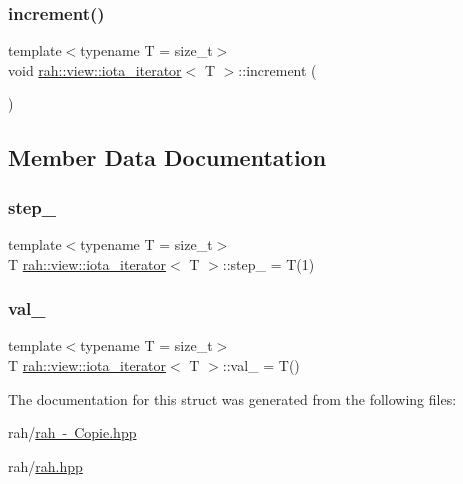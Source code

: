 \mbox{\label{structrah_1_1view_1_1iota__iterator_a52be6587654c9783137bf31d800f315d}} 
\subsubsection{\texorpdfstring{increment()}{increment()}\hspace{0.1cm}{\footnotesize\ttfamily [2/2]}}
{\footnotesize\ttfamily template$<$typename T  = size\+\_\+t$>$ \\
void \mbox{\hyperlink{structrah_1_1view_1_1iota__iterator}{rah\+::view\+::iota\+\_\+iterator}}$<$ T $>$\+::increment (\begin{DoxyParamCaption}{ }\end{DoxyParamCaption})\hspace{0.3cm}{\ttfamily [inline]}}



\subsection{Member Data Documentation}
\mbox{\label{structrah_1_1view_1_1iota__iterator_ac30abc689d8d82810bf78ceec3893bd2}} 
\subsubsection{\texorpdfstring{step\_}{step\_}}
{\footnotesize\ttfamily template$<$typename T  = size\+\_\+t$>$ \\
T \mbox{\hyperlink{structrah_1_1view_1_1iota__iterator}{rah\+::view\+::iota\+\_\+iterator}}$<$ T $>$\+::step\+\_\+ = T(1)}

\mbox{\label{structrah_1_1view_1_1iota__iterator_a7a2ef77dc1a09b2eea42804c2297d057}} 
\subsubsection{\texorpdfstring{val\_}{val\_}}
{\footnotesize\ttfamily template$<$typename T  = size\+\_\+t$>$ \\
T \mbox{\hyperlink{structrah_1_1view_1_1iota__iterator}{rah\+::view\+::iota\+\_\+iterator}}$<$ T $>$\+::val\+\_\+ = T()}



The documentation for this struct was generated from the following files\+:\begin{DoxyCompactItemize}
\item 
rah/\mbox{\hyperlink{rah_01-_01_copie_8hpp}{rah -\/ Copie.\+hpp}}\item 
rah/\mbox{\hyperlink{rah_8hpp}{rah.\+hpp}}\end{DoxyCompactItemize}
